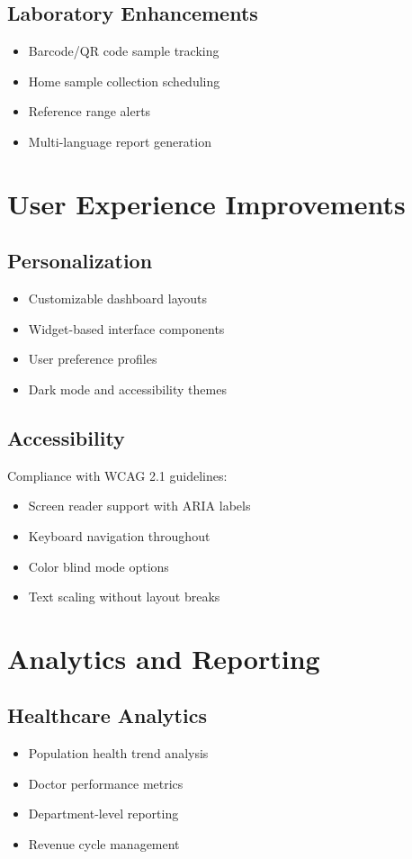 \subsection{Laboratory Enhancements}
\begin{itemize}
    \item Barcode/QR code sample tracking
    \item Home sample collection scheduling
    \item Reference range alerts
    \item Multi-language report generation
\end{itemize}

\section{User Experience Improvements}

\subsection{Personalization}
\begin{itemize}
    \item Customizable dashboard layouts
    \item Widget-based interface components
    \item User preference profiles
    \item Dark mode and accessibility themes
\end{itemize}

\subsection{Accessibility}
Compliance with WCAG 2.1 guidelines:
\begin{itemize}
    \item Screen reader support with ARIA labels
    \item Keyboard navigation throughout
    \item Color blind mode options
    \item Text scaling without layout breaks
\end{itemize}

\section{Analytics and Reporting}

\subsection{Healthcare Analytics}
\begin{itemize}
    \item Population health trend analysis
    \item Doctor performance metrics
    \item Department-level reporting
    \item Revenue cycle management
\end{itemize}

